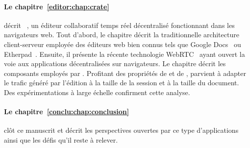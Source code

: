 \paragraph{Le chapitre~\ref{editor:chap:crate}} décrit
\CRATE~\cite{nedelec2016crate}, un éditeur collaboratif temps réel décentralisé
fonctionnant dans les navigateurs web.  Tout d'abord, le chapitre décrit la
traditionnelle architecture client-serveur employée des éditeurs web bien connus
tels que Google Docs~\cite{googledocs} ou Etherpad~\cite{etherpad}.  Ensuite, il
présente la récente technologie WebRTC~\cite{webrtc} ayant ouvert la voie aux
applications décentralisées sur navigateurs. Le chapitre décrit les composants
employés par \CRATE.  Profitant des propriétés de \SPRAY et de \LSEQ, \CRATE
parvient à adapter le trafic généré par l'édition à la taille de la session et à
la taille du document. Des expérimentations à large échelle confirment cette
analyse.

\paragraph{Le chapitre~\ref{conclu:chap:conclusion}} clôt ce manuscrit et décrit
les perspectives ouvertes par ce type d'applications ainsi que les défis qu'il
reste à relever.


